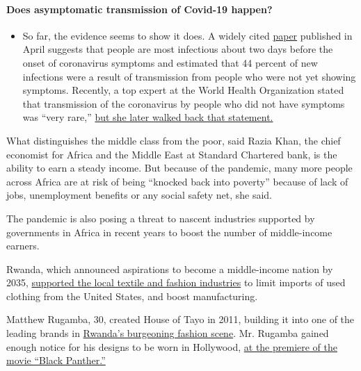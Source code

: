 \begin{itemize}
{  \paragraph{Does asymptomatic transmission of Covid-19
  happen?}\label{does-asymptomatic-transmission-of-covid-19-happen}}

  \begin{itemize}
  \tightlist
  \item
    So far, the evidence seems to show it does. A widely cited
    \href{https://www.nature.com/articles/s41591-020-0869-5}{paper}
    published in April suggests that people are most infectious about
    two days before the onset of coronavirus symptoms and estimated that
    44 percent of new infections were a result of transmission from
    people who were not yet showing symptoms. Recently, a top expert at
    the World Health Organization stated that transmission of the
    coronavirus by people who did not have symptoms was ``very rare,''
    \href{https://www.nytimes.com/2020/06/09/world/coronavirus-updates.html?action=click\&pgtype=Article\&state=default\&region=MAIN_CONTENT_3\&context=storylines_faq\#link-1f302e21}{but
    she later walked back that statement.}
  \end{itemize}
\end{itemize}

What distinguishes the middle class from the poor, said Razia Khan, the
chief economist for Africa and the Middle East at Standard Chartered
bank, is the ability to earn a steady income. But because of the
pandemic, many more people across Africa are at risk of being ``knocked
back into poverty'' because of lack of jobs, unemployment benefits or
any social safety net, she said.

The pandemic is also posing a threat to nascent industries supported by
governments in Africa in recent years to boost the number of
middle-income earners.

Rwanda, which announced aspirations to become a middle-income nation by
2035,
\href{https://www.nytimes.com/2017/10/12/world/africa/east-africa-rwanda-used-clothing.html}{supported
the local textile and fashion industries} to limit imports of used
clothing from the United States, and boost manufacturing.

Matthew Rugamba, 30, created House of Tayo in 2011, building it into one
of the leading brands in
\href{https://www.nytimes.com/2018/04/04/travel/kigali-rwanda-fashion-designers.html}{Rwanda's
burgeoning fashion scene}. Mr. Rugamba gained enough notice for his
designs to be worn in Hollywood,
\href{https://www.instagram.com/p/BevpsRVjGWH/?utm_source=ig_embed}{at
the premiere of the movie ``Black Panther.''}

